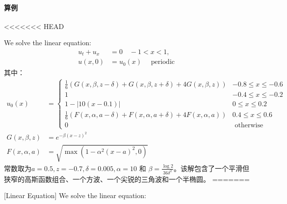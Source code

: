 \documentclass{book}
\begin{document}
\begin{example}
\begin{example}{}{}
\begin{example}
\begin{example}
\begin{example}
\paragraph{算例}
<<<<<<< HEAD
\begin{example}
We solve the linear equation\cite{RN56}:
\begin{equation}
    \begin{aligned}
        u_{t}+u_{x} & =0 \quad-1<x<1,                    \\
        u(x, 0)     & =u_{0}(x) \quad \text { periodic }
    \end{aligned}
\end{equation}
其中：
\begin{equation}
    \begin{aligned}
        u_{0}(x)        & =\begin{cases}
                               \frac{1}{6}(G(x, \beta, z-\delta)+G(x, \beta, z+\delta)+4 G(x, \beta, z))    & -0.8 \leq x \leq-0.6 \\
                               1                                                                            & -0.4 \leq x \leq-0.2 \\
                               1-|10(x-0.1)|                                                                & 0 \leq x \leq 0.2    \\
                               \frac{1}{6}(F(x, \alpha, a-\delta)+F(x, \alpha, a+\delta)+4 F(x, \alpha, a)) & 0.4 \leq x \leq 0.6  \\
                               0                                                                            & \text { otherwise }
                           \end{cases} \\
        G(x, \beta, z)  & =e^{-\beta(x-z)^{2}}                                                                                 \\
        F(x, \alpha, a) & =\sqrt{\max \left(1-\alpha^{2}(x-a)^{2}, 0\right)}
    \end{aligned}
\end{equation}
常数取为$a=0.5, z=-0.7, \delta=0.005, \alpha=10$ 和 $\beta=\frac{\log 2}{36 \delta^{2}}$。该解包含了一个平滑但狭窄的高斯函数组合、一个方波、一个尖锐的三角波和一个半椭圆。
=======
\begin{example}{}{}
    [Linear Equation]
    We solve the linear equation\cite{RN56}:
    \begin{equation}
        \begin{aligned}

\end{aligned}
\end{equation}
\end{example}
\end{example}
\end{example}
\end{example}
\end{example}
\end{example}
\end{example}
\end{document}
